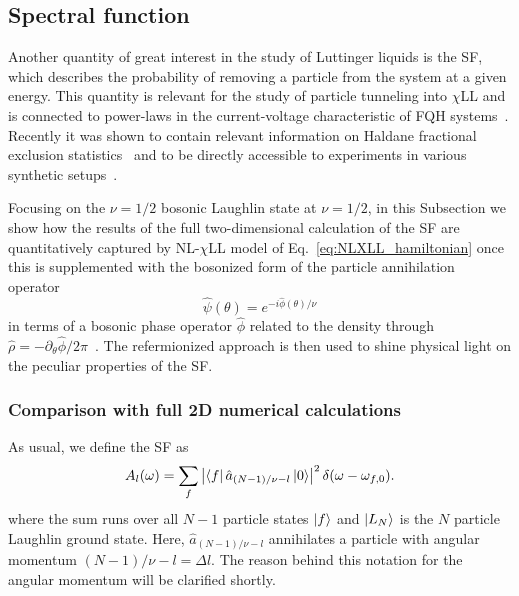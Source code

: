 \documentclass[twocolumn,pra,superscriptaddress,noshowpacs]{revtex4}
\newcommand{\nlchill}{NL-$\chi$LL }
\begin{document}
\subsection{Spectral function }\label{subsec:spectral_function}

Another quantity of great interest in the study of Luttinger liquids is the SF, which describes the probability of removing a particle from the system at a given energy.
This quantity is relevant for the study of particle tunneling into $\chi$LL and is connected to power-laws in the current-voltage characteristic of FQH systems~\cite{Wen_PRB_1991b}. Recently it was shown to contain relevant information on Haldane fractional exclusion statistics~\cite{CooperSimon_PRL_2015} and to be directly accessible to experiments in various synthetic setups~\cite{CooperSimon_PRL_2015,Umucalilar_PRA_2017}.

Focusing on the $\nu=1/2$ bosonic Laughlin state at $\nu=1/2$, in this Subsection we show how the results of the full two-dimensional calculation of the SF are quantitatively captured by \nlchill model of Eq.~\eqref{eq:NLXLL_hamiltonian} once this is supplemented with the bosonized form of the particle annihilation operator~\cite{Wen_intJModPhysB_1992}
\begin{equation}
    \hat{\psi}(\theta) = e^{-i\hat{\phi}(\theta)/\nu}
    \label{eq:bosonized_annihil}
\end{equation}
in terms of a bosonic phase operator $\hat{\phi}$ related to the density through $\hat{\rho}=-\partial_\theta\hat{\phi}/2\pi$~\cite{Wen_intJModPhysB_1992, Wen_AdvPhys_1995}. The refermionized approach is then used to shine physical light on the peculiar properties of the SF.

\subsubsection{Comparison with full 2D numerical calculations}

As usual, we define the SF as
\begin{equation}
    \label{eq:spectralFunction}
    A_l(\omega)=\sum_{f} \left| \bra{f}\hat{a}_{(N-1)/\nu-l}\ket{0}\right|^2\delta(\omega - \omega_{f,0}).
\end{equation}
where the sum runs over all $N-1$ particle states $\ket{f}$ and $\ket{L_N}$ is the $N$ particle Laughlin ground state. Here, $\hat{a}_{(N-1)/\nu-l}$ annihilates a particle with angular momentum $(N-1)/\nu-l=\Delta l$. The reason behind this notation for the angular momentum will be clarified shortly.
\end{document}
